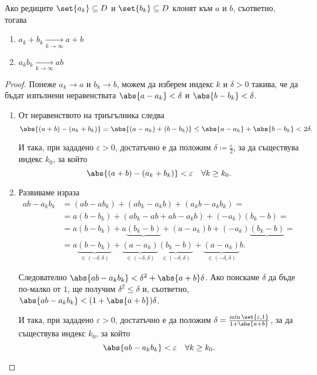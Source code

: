 \documentclass{../../common/topic}
\begin{document}
\begin{proposition}\label{thm:limits_of_elementwise_sums_and_products}
  Ако редиците \( \set{ a_k } \subseteq D \) и \( \set{ b_k } \subseteq D \) клонят към \( a \) и \( b \), съответно, тогава
  \begin{enumerate}
    \item \( a_k + b_k \xrightarrow[k \to \infty]{} a + b \)
    \item \( a_k b_k \xrightarrow[k \to \infty]{} a b \)
  \end{enumerate}
\end{proposition}
\begin{proof}
  Понеже \( a_k \to a \) и \( b_k \to b \), можем да изберем индекс \( k \) и \( \delta > 0 \) такива, че да бъдат изпълнени неравенствата \( \abs{a - a_k} < \delta \) и \( \abs{b - b_k} < \delta \).

  \begin{enumerate}
    \item От неравенството на триъгълника следва
    \begin{equation*}
      \abs{(a + b) - (a_k + b_k)}
      =
      \abs{(a - a_k) + (b - b_k)}
      \leq
      \abs{a - a_k} + \abs{b - b_k}
      <
      2\delta.
    \end{equation*}

    И така, при зададено \( \varepsilon > 0 \), достатъчно е да положим \( \delta \coloneqq \tfrac \varepsilon 2 \), за да съществува индекс \( k_0 \), за който
    \begin{equation*}
      \abs{(a + b) - (a_k + b_k)} < \varepsilon \quad\forall k \geq k_0.
    \end{equation*}

    \item Развиваме израза
    \begin{align*}
      ab - a_k b_k
      &=
      (ab - a b_k) + (a b_k - a_k b) + (a_k b - a_k b_k)
      = \\ &=
      a (b - b_k) + (a b_k - ab + ab - a_k b) + (-a_k)(b_k - b)
      = \\ &=
      a (b - b_k) + a \underbrace{(b_k - b)} + (a - a_k) b + (-a_k)\underbrace{(b_k - b)}
      = \\ &=
      a \underbrace{(b - b_k)}_{\in (-\delta, \delta)} + \underbrace{(a - a_k)}_{\in (-\delta, \delta)} \underbrace{(b_k - b)}_{\in (-\delta, \delta)} + \underbrace{(a - a_k)}_{\in (-\delta, \delta)} b.
    \end{align*}

    Следователно \( \abs{ab - a_k b_k} < \delta^2 + \abs{a + b} \delta \). Ако поискаме \( \delta \) да бъде по-малко от \( 1 \), ще получим \( \delta^2 \leq \delta \) и, съответно, \( \abs{ab - a_k b_k} < (1 + \abs{a + b}) \delta \).

    И така, при зададено \( \varepsilon > 0 \), достатъчно е да положим \( \delta = \tfrac {\min \set{\varepsilon, 1 }} {1 + \abs{a + b}} \), за да съществува индекс \( k_0 \), за който
    \begin{equation*}
      \abs{ab - a_k b_k} < \varepsilon \quad\forall k \geq k_0.
    \end{equation*}
  \end{enumerate}
\end{proof}
\end{document}
